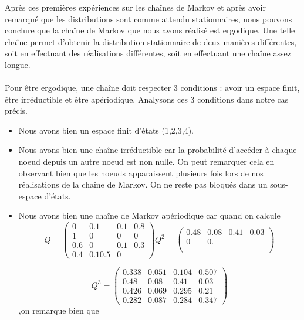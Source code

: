 \subsubsection{}
\label{section:1.1.4}
Après ces premières expériences sur les chaînes de Markov et après avoir remarqué que les distributions sont comme attendu stationnaires, nous pouvons conclure que la chaîne de Markov que nous avons réalisé est ergodique.
Une telle chaîne permet d'obtenir la distribution stationnaire de deux manières différentes, soit en effectuant des réalisations différentes, soit en effectuant une chaîne assez longue.
\\\\
Pour être ergodique, une chaîne doit respecter 3 conditions : avoir un espace finit, être irréductible et être apériodique. Analysons ces 3 conditions dans notre cas précis.

\begin{itemize}
  \item Nous avons bien un espace finit d'états (1,2,3,4).
  \item Nous avons bien une chaîne irréductible car la probabilité d'accéder à chaque noeud depuis un autre noeud est non nulle. On peut remarquer cela en observant bien que les noeuds apparaissent plusieurs fois lors de nos réalisations de la chaîne de Markov. On ne reste pas bloqués dans un sous-espace d'états.
  \item Nous avons bien une chaîne de Markov apériodique car quand on calcule 
  \begin{equation*}
    Q = \begin{pmatrix}
      0 & 0.1 & 0.1 & 0.8\\
      1 & 0 & 0 & 0\\
      0.6 & 0 & 0.1 & 0.3\\
      0.4 & 0.1 0.5 & 0
    \end{pmatrix}
    Q^2 = \begin{pmatrix}
      0.48 & 0.08 & 0.41 & 0.03\\
      0 & 0.\\
      \\
    \end{pmatrix}
  \end{equation*}

  \begin{equation*}
    Q^3 = \begin{pmatrix}
      0.338 & 0.051 & 0.104 & 0.507\\
      0.48 & 0.08 & 0.41 & 0.03\\
      0.426 & 0.069 & 0.295 & 0.21\\
      0.282 & 0.087 & 0.284 & 0.347
    \end{pmatrix}
\end{equation*}
,on remarque bien que 
\end{itemize}